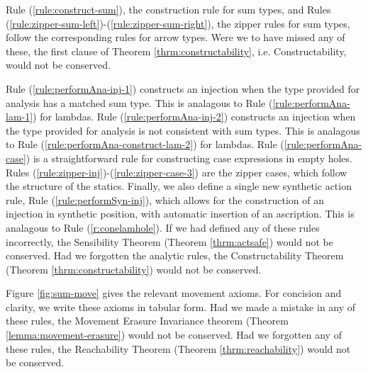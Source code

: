 Rule (\ref{rule:construct-sum}), the construction rule for sum types, and Rules (\ref{rule:zipper-sum-left})-(\ref{rule:zipper-sum-right}), the zipper rules for sum types, follow the corresponding rules for arrow types. Were we to have missed any of these, the first clause of Theorem \ref{thrm:constructability},  i.e. Constructability, would not be conserved.

Rule (\ref{rule:performAna-inj-1}) constructs an injection when the type provided for analysis has a matched sum type. This is analagous to Rule (\ref{rule:performAna-lam-1}) for lambdas. Rule (\ref{rule:performAna-inj-2}) constructs an injection when the type provided for analysis is not consistent with sum types. This is analagous to Rule (\ref{rule:performAna-construct-lam-2}) for lambdas. Rule (\ref{rule:performAna-case}) is a straightforward rule for constructing case expressions in empty holes. Rules (\ref{rule:zipper-inj})-(\ref{rule:zipper-case-3}) are the zipper cases, which follow the structure of the statics. Finally, we also define a single new synthetic action rule, Rule (\ref{rule:performSyn-inj}), which allows for the construction of an injection in synthetic position, with automatic insertion of an ascription. This is analagous to Rule (\ref{r:conelamhole}). If we had defined any of these rules incorrectly, the Sensibility Theorem (Theorem \ref{thrm:actsafe}) would not be conserved. Had we forgotten the analytic rules, the Constructability Theorem (Theorem \ref{thrm:constructability}) would not be conserved.

Figure \ref{fig:sum-move} gives the relevant movement axioms. For concision and clarity, we write these axioms in tabular form. Had we made a mistake in any of these rules, the Movement Erasure Invariance theorem (Theorem \ref{lemma:movement-erasure}) would not be conserved. Had we forgotten any of these rules, the Reachability Theorem (Theorem \ref{thrm:reachability}) would not be conserved.

